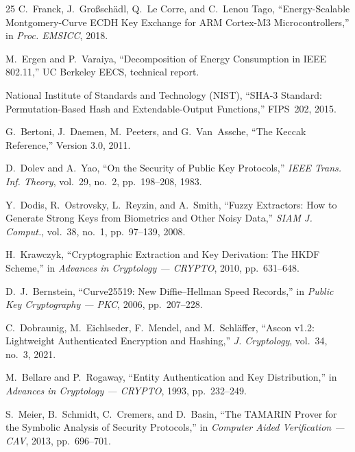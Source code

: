 \documentclass[11pt,a4paper]{article}
\begin{document}
\begin{thebibliography}{25}
C.~Franck, J.~Gro{\ss}sch\"adl, Q.~Le Corre, and C.~Lenou Tago, ``Energy-Scalable Montgomery-Curve ECDH Key Exchange for ARM Cortex-M3 Microcontrollers,'' in \textit{Proc. EMSICC}, 2018.

M.~Ergen and P.~Varaiya, ``Decomposition of Energy Consumption in IEEE 802.11,'' UC Berkeley EECS, technical report.

National Institute of Standards and Technology (NIST), ``SHA-3 Standard: Permutation-Based Hash and Extendable-Output Functions,'' FIPS~202, 2015.

G.~Bertoni, J.~Daemen, M.~Peeters, and G.~Van~Assche, ``The Keccak Reference,'' Version 3.0, 2011.

D.~Dolev and A.~Yao, ``On the Security of Public Key Protocols,'' \textit{IEEE Trans. Inf. Theory}, vol.~29, no.~2, pp.~198--208, 1983.

Y.~Dodis, R.~Ostrovsky, L.~Reyzin, and A.~Smith, ``Fuzzy Extractors: How to Generate Strong Keys from Biometrics and Other Noisy Data,'' \textit{SIAM J. Comput.}, vol.~38, no.~1, pp.~97--139, 2008.

H.~Krawczyk, ``Cryptographic Extraction and Key Derivation: The HKDF Scheme,'' in \textit{Advances in Cryptology --- CRYPTO}, 2010, pp.~631--648.

D.~J.~Bernstein, ``Curve25519: New Diffie--Hellman Speed Records,'' in \textit{Public Key Cryptography --- PKC}, 2006, pp.~207--228.

C.~Dobraunig, M.~Eichlseder, F.~Mendel, and M.~Schl\"affer, ``Ascon v1.2: Lightweight Authenticated Encryption and Hashing,'' \textit{J. Cryptology}, vol.~34, no.~3, 2021.

M.~Bellare and P.~Rogaway, ``Entity Authentication and Key Distribution,'' in \textit{Advances in Cryptology --- CRYPTO}, 1993, pp.~232--249.

S.~Meier, B.~Schmidt, C.~Cremers, and D.~Basin, ``The TAMARIN Prover for the Symbolic Analysis of Security Protocols,'' in \textit{Computer Aided Verification --- CAV}, 2013, pp.~696--701.

\end{thebibliography}
\end{document}
